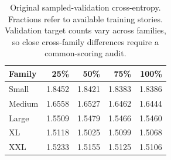 \begin{table}[tbp]
\centering\small
\caption{Original sampled-validation cross-entropy. Fractions refer to available training stories. Validation target counts vary across families, so close cross-family differences require a common-scoring audit.}
\label{tab:grid}
\begin{tabular}{lrrrr}
\toprule
Family & 25\% & 50\% & 75\% & 100\%\\
\midrule
Small & 1.8452 & 1.8421 & 1.8383 & 1.8386\\
Medium & 1.6558 & 1.6527 & 1.6462 & 1.6444\\
Large & 1.5509 & 1.5479 & 1.5466 & 1.5460\\
XL & 1.5118 & 1.5025 & 1.5099 & 1.5068\\
XXL & 1.5233 & 1.5155 & 1.5125 & 1.5106\\
\bottomrule
\end{tabular}
\end{table}
